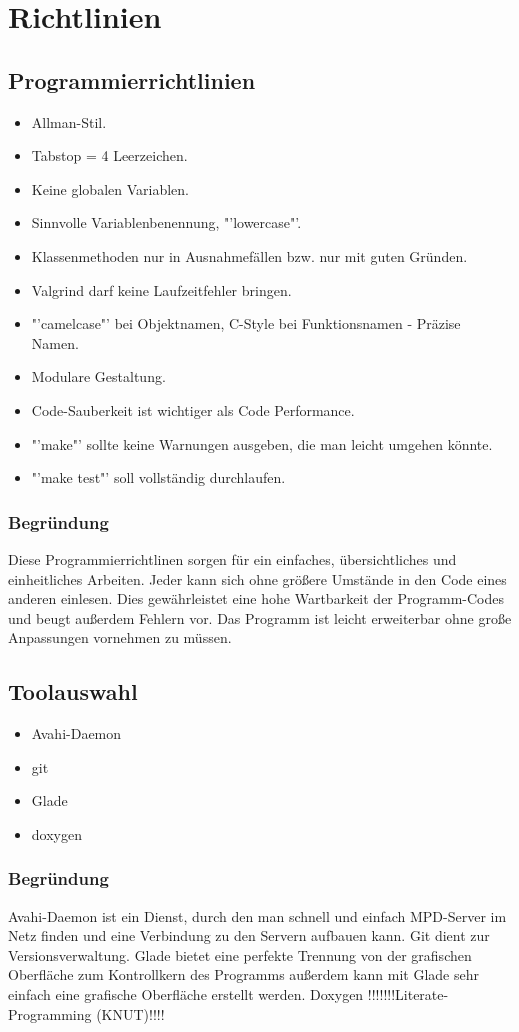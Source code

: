 \chapter{Richtlinien}
\section{Programmierrichtlinien}
\renewcommand{\labelitemi}{•}
\begin{itemize}
	\item Allman-Stil.
	\item Tabstop = 4 Leerzeichen.
	\item Keine globalen Variablen.
	\item Sinnvolle Variablenbenennung, "'lowercase"'.
	\item Klassenmethoden nur in Ausnahmefällen bzw. nur mit guten Gründen.
	\item Valgrind darf keine Laufzeitfehler bringen.
	\item "'camelcase"' bei Objektnamen, C-Style bei Funktionsnamen - Präzise Namen.
	\item Modulare Gestaltung.
	\item Code-Sauberkeit ist wichtiger als Code Performance.
	\item "'make"' sollte keine Warnungen ausgeben, die man leicht umgehen könnte.
	\item "'make test"' soll vollständig durchlaufen.
\end{itemize}
\subsection{Begründung}
Diese Programmierrichtlinen sorgen für ein einfaches, übersichtliches und einheitliches Arbeiten.
Jeder kann sich ohne größere Umstände in den Code eines anderen einlesen. Dies gewährleistet eine 
hohe Wartbarkeit der Programm-Codes und beugt außerdem Fehlern vor. Das Programm ist leicht 
erweiterbar ohne große Anpassungen vornehmen zu müssen.
\section{Toolauswahl}
\begin{itemize}
	\item Avahi-Daemon
	\item git 
	\item Glade
	\item doxygen
\end{itemize}
\subsection{Begründung}
Avahi-Daemon ist ein Dienst, durch den man schnell und einfach MPD-Server im Netz finden und eine 
Verbindung zu den Servern aufbauen kann. Git dient zur Versionsverwaltung. Glade bietet eine perfekte
Trennung von der grafischen Oberfläche zum Kontrollkern des Programms außerdem kann mit Glade sehr 
einfach eine grafische Oberfläche erstellt werden. Doxygen !!!!!!!Literate-Programming (KNUT)!!!!

